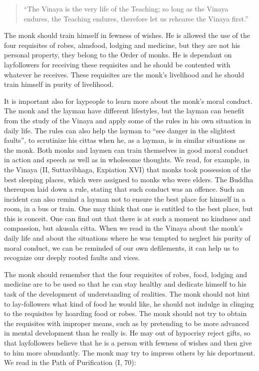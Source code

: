 \documentclass{book}
\begin{document}
\begin{quote}
``The Vinaya is the very life of the Teaching; so long as the Vinaya
endures, the Teaching endures, therefore let us rehearse the Vinaya
first.''
\end{quote}

The monk should train himself in fewness of wishes. He is allowed the
use of the four requisites of robes, almsfood, lodging and medicine, but
they are not his personal property, they belong to the Order of monks.
He is dependant on layfollowers for receiving these requisites and he
should be contented with whatever he receives. These requisites are the
monk's livelihood and he should train himself in purity of livelihood.

It is important also for laypeople to learn more about the monk's moral
conduct. The monk and the layman have different lifestyles, but the
layman can benefit from the study of the Vinaya and apply some of the
rules in his own situation in daily life. The rules can also help the
layman to ``see danger in the slightest faults'', to scrutinize his
cittas when he, as a layman, is in similar situations as the monk. Both
monks and laymen can train themselves in good moral conduct in action
and speech as well as in wholesome thoughts. We read, for example, in
the Vinaya (II, Suttavibhaga, Expiation XVI) that monks took possession
of the best sleeping places, which were assigned to monks who were
elders. The Buddha thereupon laid down a rule, stating that such conduct
was an offence. Such an incident can also remind a layman not to ensure
the best place for himself in a room, in a bus or train. One may think
that one is entitled to the best place, but this is conceit. One can
find out that there is at such a moment no kindness and compassion, but
akusala citta. When we read in the Vinaya about the monk's daily life
and about the situations where he was tempted to neglect his purity of
moral conduct, we can be reminded of our own defilements, it can help us
to recognize our deeply rooted faults and vices.

The monk should remember that the four requisites of robes, food,
lodging and medicine are to be used so that he can stay healthy and
dedicate himself to his task of the development of understanding of
realities. The monk should not hint to lay-followers what kind of food
he would like, he should not indulge in clinging to the requisites by
hoarding food or robes. The monk should not try to obtain the requisites
with improper means, such as by pretending to be more advanced in mental
development than he really is. He may out of hypocrisy reject gifts, so
that layfollowers believe that he is a person with fewness of wishes and
then give to him more abundantly. The monk may try to impress others by
his deportment. We read in the Path of Purification (I, 70):
\end{document}

